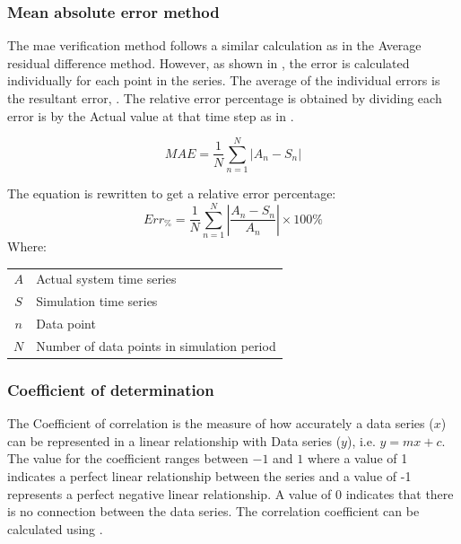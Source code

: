  		\subsubsection{Mean absolute error method}
 		The \gls{mae} verification method follows a similar calculation as in the Average residual difference method. However, as shown in , the error is calculated individually for each point in the series. The average of the individual errors is the resultant error, . The relative error percentage is obtained by dividing each error is by the Actual value at that time step as in .
 		\par
 		\begin{equation}
 		\label{eq: Relative error 2}
 		MAE = \dfrac{1}{N}\sum_{n=1}^{N}{\left|A_{n} - S_{n}\right| }
 		\end{equation}
 		
 			The equation is rewritten to get a relative error percentage:	
 			\begin{equation}
 			\label{eq: Relative error}
 			Err_{\%} = \dfrac{1}{N}\sum_{n=1}^{N}{\left|\dfrac{A_{n} - S_{n}}{A_{n}}\right| }\times 100 \%
 			\end{equation}
 			Where: \par
 			\begin{table}[!htbp]
 				\centering
 				\begin{tabular}{cl}
 					$A$ & Actual system time series \\
 					$S$ & Simulation time series \\
 					$n$ & Data point \\
 					$N$ & Number of data points in simulation period \\
 				\end{tabular} 
 			\end{table} 
 		\subsubsection{Coefficient of determination}
 		The Coefficient of correlation is the measure of how accurately a data series ($ x $) can be represented in a linear relationship with Data series ($ y $), i.e. $ y = mx+c$. The value for the coefficient ranges between $ -1 $ and $ 1 $ where a value of 1 indicates a perfect linear relationship between the series and a value of -1 represents a perfect negative linear relationship. A value of 0 indicates that there is no connection between the data series. The correlation coefficient can be calculated using  \cite{sarin2010comparing}.
 		
